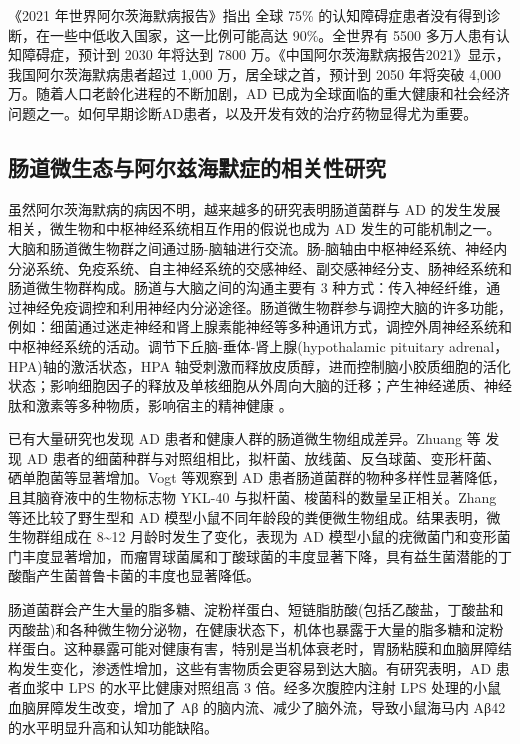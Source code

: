\documentclass[supercite]{HustGraduPaper}
\begin{document}
《2021 年世界阿尔茨海默病报告》指出 全球 75\% 的认知障碍症患者没有得到诊断，在一些中低收入国家，这一比例可能高达 90\%。全世界有 5500 多万人患有认知障碍症，预计到 2030 年将达到 7800 万\cite{gauthier2021world}。《中国阿尔茨海默病报告2021》显示，我国阿尔茨海默病患者超过 1,000 万，居全球之首，预计到 2050 年将突破 4,000 万\cite{任汝静2021中国阿尔茨海默病报告}。随着人口老龄化进程的不断加剧，AD 已成为全球面临的重大健康和社会经济问题之一。如何早期诊断AD患者，以及开发有效的治疗药物显得尤为重要。


\subsection{肠道微生态与阿尔兹海默症的相关性研究}

虽然阿尔茨海默病的病因不明，越来越多的研究表明肠道菌群与 AD 的发生发展相关，微生物和中枢神经系统相互作用的假说也成为 AD 发生的可能机制之一。大脑和肠道微生物群之间通过肠-脑轴进行交流。肠-脑轴由中枢神经系统、神经内分泌系统、免疫系统、自主神经系统的交感神经、副交感神经分支、肠神经系统和肠道微生物群构成\cite{la2018gut}。肠道与大脑之间的沟通主要有 3 种方式：传入神经纤维，通过神经免疫调控和利用神经内分泌途径\cite{westfall2017microbiome}。肠道微生物群参与调控大脑的许多功能，例如：细菌通过迷走神经和肾上腺素能神经等多种通讯方式，调控外周神经系统和中枢神经系统的活动。调节下丘脑-垂体-肾上腺(hypothalamic pituitary adrenal，HPA)轴的激活状态，HPA 轴受刺激而释放皮质醇，进而控制脑小胶质细胞的活化状态；影响细胞因子的释放及单核细胞从外周向大脑的迁移；产生神经递质、神经肽和激素等多种物质，影响宿主的精神健康\cite{mayer2015gut} 。

已有大量研究也发现 AD 患者和健康人群的肠道微生物组成差异。Zhuang 等\cite{zhuang2018gut} 发现 AD 患者的细菌种群与对照组相比，拟杆菌、放线菌、反刍球菌、变形杆菌、硒单胞菌等显著增加。Vogt 等\cite{vogt2017gut}观察到 AD 患者肠道菌群的物种多样性显著降低，且其脑脊液中的生物标志物 YKL-40 与拟杆菌、梭菌科的数量呈正相关。Zhang 等\cite{zhang2017altered}还比较了野生型和 AD 模型小鼠不同年龄段的粪便微生物组成。结果表明，微生物群组成在 8\textasciitilde12 月龄时发生了变化，表现为 AD 模型小鼠的疣微菌门和变形菌门丰度显著增加，而瘤胃球菌属和丁酸球菌的丰度显著下降，具有益生菌潜能的丁酸酯产生菌普鲁卡菌的丰度也显著降低。

肠道菌群会产生大量的脂多糖、淀粉样蛋白、短链脂肪酸(包括乙酸盐，丁酸盐和丙酸盐)和各种微生物分泌物，在健康状态下，机体也暴露于大量的脂多糖和淀粉样蛋白\cite{zhao2015microbiome}。这种暴露可能对健康有害，特别是当机体衰老时，胃肠粘膜和血脑屏障结构发生变化，渗透性增加，这些有害物质会更容易到达大脑。有研究表明，AD 患者血浆中 LPS 的水平比健康对照组高 3 倍\cite{zhang2009circulating}。经多次腹腔内注射 LPS 处理的小鼠血脑屏障发生改变，增加了 Aβ 的脑内流、减少了脑外流，导致小鼠海马内 Aβ42 的水平明显升高和认知功能缺陷\cite{jaeger2009lipopolysaccharide}。
\end{document}

